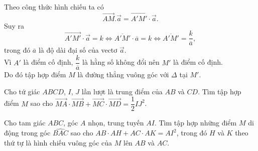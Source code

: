 \begin{bt}
{\begin{enumerate}
			Theo công thức hình chiếu ta có $$\overrightarrow{AM}.\overrightarrow{a}=\overrightarrow{A'M'}\cdot \overrightarrow{a}.$$
			Suy ra $$\overrightarrow{A'M'}\cdot \overrightarrow{a}=k\Leftrightarrow \overline{A'M'}\cdot \overline{a}=k\Leftrightarrow \overline{A'M'}=\dfrac{k}{\overline{a}},$$ trong đó $\overline{a}$ là độ dài đại số của vectơ $\overrightarrow{a}$.\\
			Vì $A'$ là điểm cố định, $\dfrac{k}{\overline{a}}$ là hằng số không đổi nên $M'$ là điểm cố định.\\
			Do đó tập hợp điểm $M$ là đường thẳng vuông góc với $\Delta $ tại $M'$.
			
		\end{enumerate}
	}
\end{bt}
\begin{bt}%
	Cho tứ giác $ABCD$, $I$, $J$ lần lượt là trung điểm của $AB$ và $CD$. Tìm tập hợp điểm $M$ sao cho $\overrightarrow{MA}\cdot \overrightarrow{MB}+\overrightarrow{MC}\cdot \overrightarrow{MD}=\dfrac{1}{2}IJ^2$.
\end{bt}
\begin{bt}%
	Cho tam giác $ABC$, góc $A$ nhọn, trung tuyến $AI$. Tìm tập hợp những điểm $M$ di động trong góc $\widehat{BAC}$ sao cho $AB\cdot AH+AC\cdot AK=AI^2$, trong đó $H$ và $K$ theo thứ tự là hình chiếu vuông góc của $M$ lên $AB$ và $AC$.
\end{bt}
